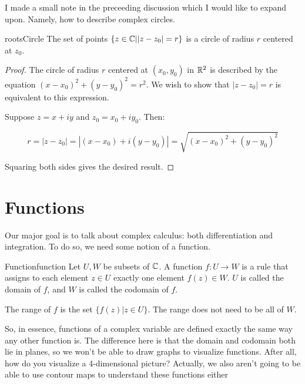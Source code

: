 I made a small note in the preceeding discussion which I would like to expand upon. Namely, how to describe complex circles.

\begin{thmbo}{}{rootsCircle}
The set of points $\{z\in\mathbb{C}| |z - z_0| = r\}$ is a circle of radius $r$ centered at $z_0$.
\end{thmbo}

\begin{proof} The circle of radius $r$ centered at $(x_0,y_0)$ in $\mathbb{R}^2$ is described by the equation $(x-x_0)^2 + (y-y_0)^2 = r^2$. We wish to show that $|z-z_0| = r$ is equivalent to this expression.

Suppose $z = x + iy$ and $z_0 = x_0 + iy_0$. Then:

$$r = |z-z_0| = |(x-x_0) + i(y-y_0)| = \sqrt{(x-x_0)^2 + (y-y_0)^2}$$

Squaring both sides gives the desired result.
\end{proof}

\section{Functions}

Our major goal is to talk about complex calculus: both differentiation and integration. To do so, we need some notion of a function. 

\begin{defbo}{Function}{function}
Let $U,W$ be subsets of $\mathbb{C}$. A function $f:U\rightarrow W$ is a rule that assigns to each element $z\in U$ exactly one element $f(z) \in W$. $U$ is called the domain of $f$, and $W$ is called the codomain of $f$.

The range of $f$ is the set $\{f(z)|z\in U\}$. The range does not need to be all of $W$.
\end{defbo}

So, in essence, functions of a complex variable are defined exactly the same way any other function is. The difference here is that the domain and codomain both lie in planes, so we won't be able to draw graphs to visualize functions. After all, how do you visualize a 4-dimensional picture? Actually, we also aren't going to be able to use contour maps to understand these functions either

